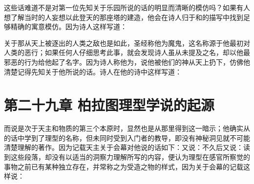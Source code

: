 这些话难道不是对第一位先知关于乐园所说的话的明显而清晰的模仿吗？如果有人想了解当时的人妄想以此登天的那座塔的建造，他会在诗人归于和的描写中找到足够精确的寓意模仿。因为诗人这样写道：\par

\par

关于那从天上被逐出的人类之敌也是如此，圣经称他为魔鬼，这名称源于他最初对人类的恶行；如果任何人仔细思考此事，就会发现诗人虽从未提及之名，却以他最邪恶的行为给他起了名字。因为诗人称他为，说他被他们的神从天上扔下，仿佛他清楚记得先知关于他所说的话。诗人在他的诗中这样写道：\par

\par


\section{第二十九章 柏拉图理型学说的起源}

而说是次于天主和物质的第三个本原时，显然也是从那里得到这一暗示；他确实从的话中学到了理型的名称，但未同时受到入门者的教导，即没有神秘洞见就不可能清楚理解的著作。因为记载天主关于会幕对他说的话如下：又说：不久后又说：读到这些段落，却没有以适当的洞察力理解所写的内容，便认为理型在感官所察觉的事物之前已有某种独立存在，并常称之为受造之物的样式，因为关于会幕的记载这样说：\par

